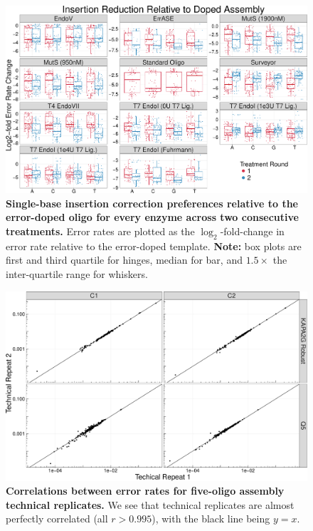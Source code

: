 \documentclass[letterpaper,12pt]{article}
\begin{document}
\clearpage
\begin{figure}[t]
\centering
\includegraphics[width=174mm]{Enzyme_Prefs_Insertions-1.pdf}
\caption{\small \textbf{Single-base insertion correction preferences relative to the error-doped oligo for every enzyme across two consecutive treatments.} Error rates are plotted as the $\log_2$-fold-change in error rate relative to the error-doped template. \textbf{Note:} box plots are first and third quartile for hinges, median for bar, and $1.5\times$ the inter-quartile range for whiskers.}
\end{figure}

\clearpage
\begin{figure}[t]
\centering
\includegraphics[width=174mm]{corrs-1.pdf}
\caption{\small \textbf{Correlations between error rates for five-oligo assembly technical replicates.} We see that technical replicates are almost perfectly correlated (all $r > 0.995$), with the black line being $y = x$.}
\end{figure}
\end{document}
